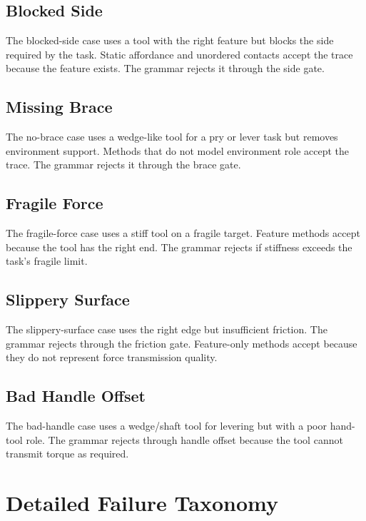\documentclass{article}
\begin{document}
\subsection{Blocked Side}

The blocked-side case uses a tool with the right feature but blocks the side required by the task. Static affordance and unordered contacts accept the trace because the feature exists. The grammar rejects it through the side gate.

\subsection{Missing Brace}

The no-brace case uses a wedge-like tool for a pry or lever task but removes environment support. Methods that do not model environment role accept the trace. The grammar rejects it through the brace gate.

\subsection{Fragile Force}

The fragile-force case uses a stiff tool on a fragile target. Feature methods accept because the tool has the right end. The grammar rejects if stiffness exceeds the task's fragile limit.

\subsection{Slippery Surface}

The slippery-surface case uses the right edge but insufficient friction. The grammar rejects through the friction gate. Feature-only methods accept because they do not represent force transmission quality.

\subsection{Bad Handle Offset}

The bad-handle case uses a wedge/shaft tool for levering but with a poor hand-tool role. The grammar rejects through handle offset because the tool cannot transmit torque as required.

\section{Detailed Failure Taxonomy}
\end{document}
